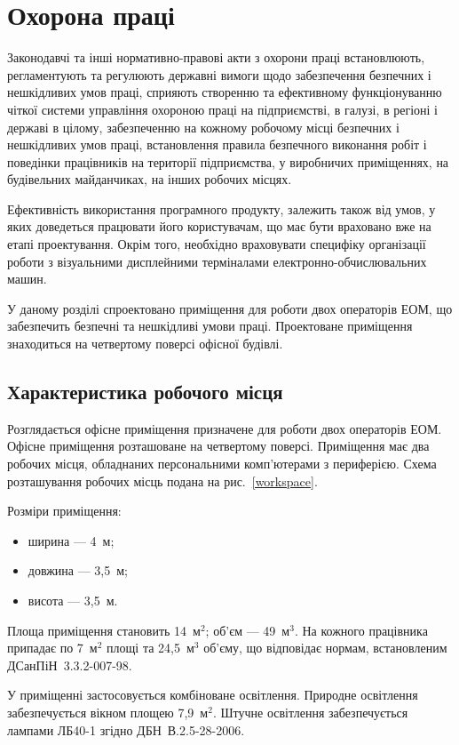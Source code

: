 \documentclass{diploma}
\begin{document}
\chapter{Охорона праці}
Законодавчі та інші нормативно-правові акти з охорони праці встановлюють, регламентують та регулюють державні вимоги щодо забезпечення безпечних і нешкідливих умов праці, сприяють створенню та ефективному функціонуванню чіткої системи управління охороною праці на підприємстві, в галузі, в регіоні і державі в цілому, забезпеченню на кожному робочому місці безпечних і нешкідливих умов праці, встановлення правила безпечного виконання робіт і поведінки працівників на території підприємства, у виробничих приміщеннях, на будівельних майданчиках, на інших робочих місцях.

Ефективність використання програмного продукту, залежить також від умов, у яких доведеться працювати його користувачам, що має бути враховано вже на етапі проектування. Окрім того, необхідно враховувати специфіку організації роботи з візуальними дисплейними терміналами електронно-обчислювальних машин.

У даному розділі спроектовано приміщення для роботи двох операторів ЕОМ, що забезпечить безпечні та нешкідливі умови праці. Проектоване приміщення знаходиться на четвертому поверсі офісної будівлі.

\section{Характеристика робочого місця}
Розглядається офісне приміщення призначене для роботи двох операторів ЕОМ. Офісне приміщення розташоване на четвертому поверсі. Приміщення має два робочих місця, обладнаних персональними комп’ютерами з периферією. Схема розташування робочих місць подана на рис.~\ref{workspace}.

Розміри приміщення:
\begin{itemize}
	\item ширина --- 4~м;
	\item довжина --- 3,5~м;
	\item висота --- 3,5~м.
\end{itemize}

Площа приміщення становить 14~м$^2$; об’єм --- 49~м$^3$. На кожного працівника припадає по 7~м$^2$ площі та 24,5~м$^3$ об’єму, що відповідає нормам, встановленим ДСанПіН~3.3.2-007-98.

У приміщенні застосовується комбіноване освітлення. Природне освітлення забезпечується вікном площею 7,9~м$^2$. Штучне освітлення забезпечується лампами ЛБ40-1 згідно ДБН~В.2.5-28-2006.
\end{document}
